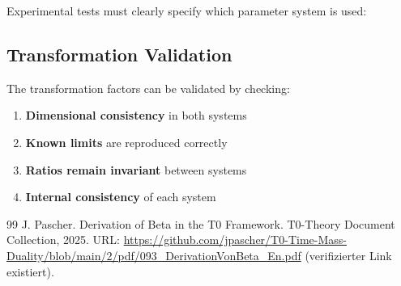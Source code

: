 	Experimental tests must clearly specify which parameter system is used:
	
	\begin{table}[htbp]
		\centering
		\caption{System-specific experimental predictions}
		\label{tab:system_predictions}
	\end{table}
	
	\subsection{Transformation Validation}
	\label{subsec:transformation_validation}
	
	The transformation factors can be validated by checking:
	
	\begin{enumerate}
		\item \textbf{Dimensional consistency} in both systems
		\item \textbf{Known limits} are reproduced correctly
		\item \textbf{Ratios remain invariant} between systems
		\item \textbf{Internal consistency} of each system
	\end{enumerate}

\begin{thebibliography}{99}
	J. Pascher.
	\newblock Derivation of Beta in the T0 Framework.
	\newblock T0-Theory Document Collection, 2025.
	\newblock URL: \url{https://github.com/jpascher/T0-Time-Mass-Duality/blob/main/2/pdf/093_DerivationVonBeta_En.pdf}
	(verifizierter Link existiert).
\end{thebibliography}